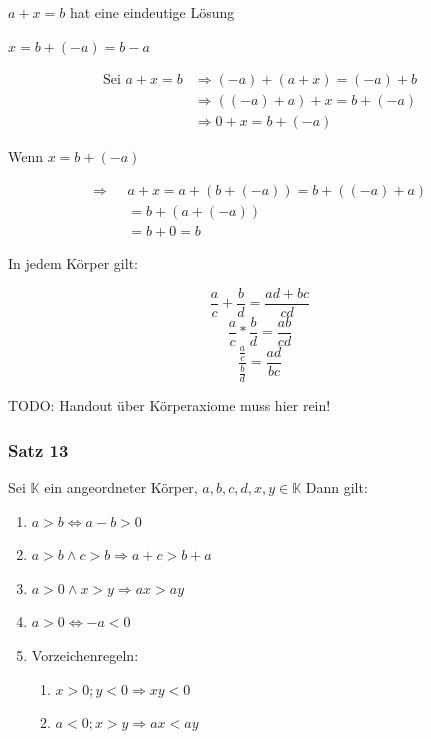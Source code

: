 \documentclass[fleqn]{scrartcl}
\newenvironment{example}{{\bfseries Beispiel }}{}
\begin{document}
\pagebreak

\begin{example}

$a+x=b$ hat eine eindeutige Lösung

$x=b+(-a)=b-a$

\begin{align*}
  \text{Sei } a+x=b & \Longrightarrow (-a)+(a+x)=(-a)+b\\
                    & \Longrightarrow ((-a)+a)+x=b+(-a)\\
                    & \Longrightarrow 0 + x = b+ (-a)
\end{align*}

Wenn $x=b+(-a)$

\begin{align*}
  \Longrightarrow \text{ } & a+x=a+(b+(-a))=b+((-a)+a)\\
                           & = b+(a+(-a))\\
                           & =b+0=b
\end{align*}

\end{example}

In jedem Körper gilt:

\[\frac{a}{c}+\frac{b}{d}=\frac{ad+bc}{cd}\]
\[\frac{a}{c}*\frac{b}{d}=\frac{ab}{cd}\]
\[\frac{\frac{a}{c}}{\frac{b}{d}}=\frac{ad}{bc}\]

TODO: Handout über Körperaxiome muss hier rein!

\subsubsection{Satz 13}

Sei $\mathbb{K}$ ein angeordneter Körper, $a,b,c,d,x,y \in \mathbb{K}$ Dann gilt:

\begin{enumerate}
  \item $a>b \Longleftrightarrow a-b>0$
  \item $a>b \wedge c>b \Longrightarrow a+c>b+a$
  \item $a>0 \wedge x > y \Longrightarrow ax>ay$
  \item $a>0 \Longleftrightarrow -a<0$
  \item Vorzeichenregeln:
  \begin{enumerate}
    \item $x>0;y<0 \Longrightarrow xy <0$
    \item $a<0; x>y \Longrightarrow ax < ay$
  \end{enumerate}
\end{enumerate}
\end{document}
